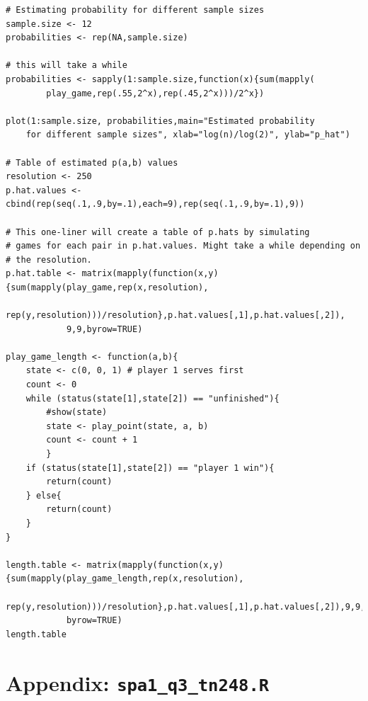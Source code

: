 \documentclass[10pt, oneside, reqno]{article}
\theoremstyle{plain}
\begin{document}
\begin{lstlisting}
# Estimating probability for different sample sizes
sample.size <- 12
probabilities <- rep(NA,sample.size)

# this will take a while
probabilities <- sapply(1:sample.size,function(x){sum(mapply(
		play_game,rep(.55,2^x),rep(.45,2^x)))/2^x})

plot(1:sample.size, probabilities,main="Estimated probability 
	for different sample sizes", xlab="log(n)/log(2)", ylab="p_hat")

# Table of estimated p(a,b) values
resolution <- 250
p.hat.values <- cbind(rep(seq(.1,.9,by=.1),each=9),rep(seq(.1,.9,by=.1),9))

# This one-liner will create a table of p.hats by simulating 
# games for each pair in p.hat.values. Might take a while depending on
# the resolution.
p.hat.table <- matrix(mapply(function(x,y){sum(mapply(play_game,rep(x,resolution),
		rep(y,resolution)))/resolution},p.hat.values[,1],p.hat.values[,2]),
			9,9,byrow=TRUE)

play_game_length <- function(a,b){
	state <- c(0, 0, 1) # player 1 serves first
	count <- 0
	while (status(state[1],state[2]) == "unfinished"){
		#show(state)
		state <- play_point(state, a, b)
		count <- count + 1
		}
	if (status(state[1],state[2]) == "player 1 win"){
		return(count)
	} else{
		return(count)
	}
}

length.table <- matrix(mapply(function(x,y){sum(mapply(play_game_length,rep(x,resolution),
		rep(y,resolution)))/resolution},p.hat.values[,1],p.hat.values[,2]),9,9,
			byrow=TRUE)
length.table
\end{lstlisting}


\newpage

\section{Appendix: \texttt{spa1\_q3\_tn248.R}} %
\label{sec:appendix_texttt_spa1_q3_tn248_r}
\end{document}

